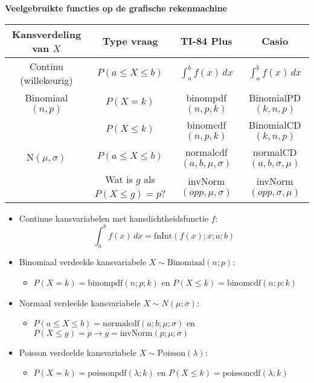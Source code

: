 \documentclass[11pt,a4paper,dutch]{article} %
\begin{document}
\textbf{Veelgebruikte functies op de grafische rekenmachine}
\begin{table}[H]
    \centering
    \begin{tabular}{cc|c|c}
        \toprule
            \textbf{Kansverdeling van $X$}  & \textbf{Type vraag} & \textbf{TI-84 Plus}         & \textbf{Casio} \\
        \midrule
            Continu (willekeurig)   & $P(a \le X \le b)$             & $\int_{a}^{b} f(x)\, dx$ & $\int_{a}^{b} f(x)\, dx$\\
        \midrule
            Binomiaal$(n,p)$        & $P(X = k)$                     & binompdf$(n,p,k)$ & BinomialPD$(k, n, p)$ \\
                                    & $P(X \le k)$                   & binomcdf$(n,p,k)$ & BinomialCD$(k, n, p)$ \\
        \midrule
            N$(\mu, \sigma)$        & $P(a \le X \le b)$             & normalcdf$(a,b,\mu,\sigma)$ & normalCD$(a, b, \sigma, \mu)$ \\
                                    & Wat is $g$ als $P(X \le g)=p$? & invNorm$(opp,\mu,\sigma)$ & invNorm$(opp, \sigma, \mu)$ \\
        \bottomrule
    \end{tabular}
\end{table}
\begin{itemize}
    \item Continue kansvariabelen met kansdichtheidsfunctie $f$:
    \[
        \int_{a}^{b} f(x)\, dx = \text{fnInt}(f(x); x; a; b)
    \]
    \item Binomiaal verdeelde kansvariabele $X \sim \text{Binomiaal}(n; p)$:
    \begin{itemize}
        \item $P(X = k) = \text{binompdf}(n; p; k)$ en $P(X \le k) = \text{binomcdf}(n; p; k)$
    \end{itemize}
    \item Normaal verdeelde kansvariabele $X \sim N(\mu; \sigma)$:
    \begin{itemize}
        \item $P(a \le X \le b) = \text{normalcdf}(a; b; \mu; \sigma)$ en $P(X \le g) = p \rightarrow g = \text{invNorm}(p; \mu; \sigma)$
    \end{itemize}
    \item Poisson verdeelde kansvariabele $X \sim \text{Poisson}(\lambda)$:
    \begin{itemize}
        \item $P(X = k) = \text{poissonpdf}(\lambda; k)$ en $P(X \le k) = \text{poissoncdf}(\lambda; k)$
    \end{itemize}
\end{itemize}
\end{document}

